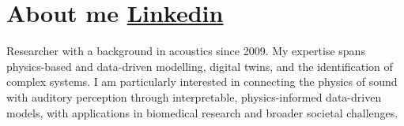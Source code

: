 \documentclass[a4paper,11pt]{article}
\newcommand{\socialicon}[1]{\raisebox{-0.05em}{\resizebox{!}{1em}{#1}}}
\begin{document}
\section{\textbf{About me} \hfill \small{
    \socialicon{\faLinkedin} \href{https://www.linkedin.com/in/hamed-f-ganji-684522166/}{Linkedin}}}
\vspace{1mm}
\small{
Researcher with a background in acoustics since 2009. My expertise spans physics-based and data-driven modelling, digital twins, and the identification of complex systems. I am particularly interested in connecting the physics of sound with auditory perception through interpretable, physics-informed data-driven models, with applications in biomedical research and broader societal challenges.
}
\end{document}
